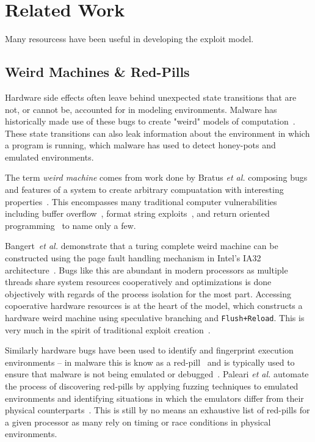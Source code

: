 
\section{Related Work}
\label{sec:related-work}

Many resourcess have been useful in developing the \speculake exploit 
model.  

\subsection{Weird Machines \& Red-Pills}
Hardware side effects often leave behind unexpected state transitions 
that are not, or cannot be, accounted for in modeling environments. Malware
has historically made use of these bugs to create "weird" models of 
computation~\cite{weird_machines}. These state transitions can also leak 
information about the environment in which a program is running, which 
malware has used to detect honey-pots and emulated environments.

The term \textit{weird machine} comes from work done by Bratus \textit{et al.}
composing bugs and features of a system to create arbitrary compuatation with 
interesting properties~\cite{weird_machines,bratus2011exploit}. This 
encompasses many traditional computer vulnerabilities including 
buffer overflow~\cite{buffer_overflow}, format string exploits~\cite{format_string_exploit}, 
and return oriented programming~\cite{shacham2007geometry} to name only a few. 

Bangert~\textit{et al.} demonstrate that a turing complete weird machine 
can be constructed using the page fault handling mechanism in Intel's
IA32 architecture~\cite{bangert2013page}. Bugs like this are abundant in
modern processors as multiple threads share system resources cooperatively
and optimizations is done objectively with regards of the 
process isolation for the most part. Accessing copoerative hardware resources is at
the heart of the \speculake model, which constructs a hardware weird machine
using speculative branching and \texttt{Flush+Reload}. This is 
very much in the spirit of traditional exploit creation~\cite{weird_exploits}.

\smallskip 

Similarly hardware bugs have been used to identify and fingerprint execution
environments -- in malware this is know as a red-pill~\cite{red-pill} and 
is typically used to ensure that malware is not being emulated or 
debugged~\cite{lindorfer2011detecting, balzarotti2010efficient}. Paleari 
\textit{et al.} automate the process of discovering red-pills by applying 
fuzzing techniques to emulated environments and identifying situations 
in which the emulators differ from their physical counterparts~\cite{paleari2009fistful}.
This is still by no means an exhaustive list of red-pills for a given 
processor as many rely on timing or race conditions in physical 
environments. 

